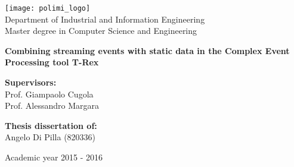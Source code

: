 \begin{titlepage}
    \begin{center}
        \texttt{[image: polimi\_logo]}\\
        \large
        Department of Industrial and Information Engineering\\
        Master degree in Computer Science and Engineering
        
        \vspace{2cm}
        
        \huge
        \textbf{Combining streaming events with static data in the Complex Event Processing tool T-Rex}
        
        \vspace{2cm}
        
        \begin{flushleft}
        \large
        \textbf{Supervisors:}\\
        Prof. Giampaolo Cugola\\
        Prof. Alessandro Margara
		\end{flushleft}
        
        \vspace{0.5cm}
        
        \begin{flushright}
        \Large
        \textbf{Thesis dissertation of:}\\
        Angelo Di Pilla (820336)
		\end{flushright}
        
        \vfill
        
        \large
        Academic year 2015 - 2016
    \end{center}
\end{titlepage}